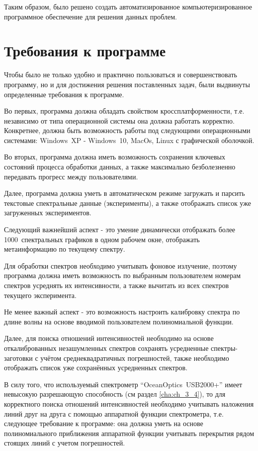 Таким образом, было решено создать автоматизированное компьютеризированное программное обеспечение для решения данных проблем.

\section{Требования к программе}
Чтобы было не только удобно и практично пользоваться и совершенствовать программу, но и для достижения решения
поставленных задач, были выдвинуты определенные требования к программе.

Во первых, программа должна обладать свойством кроссплатформенности, т.е. независимо от типа операционной
системы она должна работать корректно. Конкретнее, должна быть возможность работы под следующими операционными
системами: Windows~XP - Windows~10, MacOs, Linux с графической оболочкой.

Во вторых, программа должна иметь возможность сохранения ключевых состояний процесса обработки данных,
а также максимально безболезненно передавать прогресс между пользователями.

Далее, программа должна уметь в автоматическом режиме загружать и парсить текстовые спектральные данные
(эксперименты), а также отображать список уже загруженных экспериментов.

Следующий важнейший аспект - это умение динамически отображать более 1000~спектральных графиков в одном
рабочем окне, отображать метаинформацию по текущему спектру.

Для обработки спектров необходимо учитывать фоновое излучение, поэтому программа должна иметь возможность по
выбранным пользователем номерам спектров усреднять их интенсивности, а также вычитать из всех спектров текущего эксперимента.

Не менее важный аспект - это возможность настроить калибровку спектра по длине волны на основе вводимой пользователем полиномиальной функции.

Далее, для поиска отношений интенсивностей необходимо на основе откалиброванных незашумленных спектров сохранять
усредненные спектры-заготовки с учётом среднеквадратичных погрешностей, также необходимо отображать
список уже сохранённых усредненных спектров.

В силу того, что используемый спектрометр “OceanOptics~USB2000+” имеет невысокую разрешающую
способность (см раздел \ref{cha:ch_3_4}), то для корректного поиска отношений интенсивностей
необходимо учитывать наложения линий друг на друга с помощью аппаратной функции спектрометра,
т.е. следующее требование к программе: она должна уметь на основе полиномиального приближения аппаратной
функции учитывать перекрытия рядом стоящих линий с учетом погрешностей.

